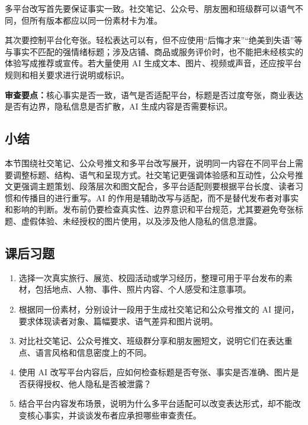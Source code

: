 \begin{critiquebox}
多平台改写首先要保证事实一致。社交笔记、公众号、朋友圈和班级群可以语气不同，但所有版本都应以同一份素材卡为准。

其次要控制平台化夸张。轻松表达可以有，但不应使用“后悔才来”“绝美到失语”等与事实不匹配的强情绪标题；涉及店铺、商品或服务评价时，也不能把未经核实的体验写成推荐或宣传\footnotemark。若大量使用 AI 生成文本、图片、视频或声音，还应按平台规则和相关要求进行说明或标识\footnotemark。

\textbf{审查要点：}核心事实是否一致，语气是否适配平台，标题是否过度夸张，商业表达是否有边界，隐私信息是否扩散，AI 生成内容是否需要标识。
\end{critiquebox}
\addtocounter{footnote}{-2}



\subsection*{小结}
本节围绕社交笔记、公众号推文和多平台改写展开，说明同一内容在不同平台上需要调整标题、结构、语气和呈现方式。社交笔记更强调体验感和互动性，公众号推文更强调主题策划、段落层次和图文配合，多平台适配则要根据平台长度、读者习惯和传播目的进行重写。AI 的作用是辅助改写与适配，而不是替代发布者对事实和影响的判断。发布前仍要检查真实性、边界意识和平台规范，尤其要避免夸张标题、虚假体验、未经授权的图片使用，以及涉及他人隐私的信息泄露。


\bigskip
\subsection*{课后习题}
\begin{enumerate}
\setlength{\itemsep}{6pt}

\item 选择一次真实旅行、展览、校园活动或学习经历，整理可用于平台发布的素材，包括地点、人物、事件、照片内容、个人感受和注意事项。

\item 根据同一份素材，分别设计一段用于生成社交笔记和公众号推文的 AI 提问，要求体现读者对象、篇幅要求、语气差异和图片说明。

\item 对比社交笔记、公众号推文、班级群分享和朋友圈短文，说明它们在表达重点、语言风格和信息密度上的不同。

\item 使用 AI 改写平台内容后，应如何检查标题是否夸张、事实是否准确、图片是否获得授权、他人隐私是否被泄露？

\item 结合平台内容发布场景，说明为什么多平台适配可以改变表达形式，却不能改变核心事实，并谈谈发布者应承担哪些审查责任。

\end{enumerate}

